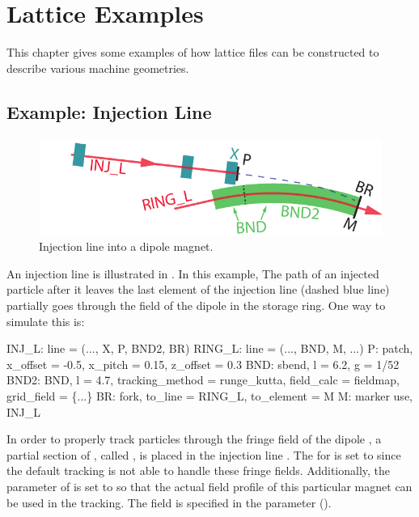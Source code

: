 \chapter{Lattice Examples}
\label{c:lat.example}

This chapter gives some examples of how lattice files can be constructed to describe various machine
geometries.

\section{Example: Injection Line}
\label{s:ex.inj}

\begin{figure}[tb]
  \centering
  \includegraphics[width=5in]{injection.pdf}
  \caption[Injection line into a dipole magnet.]{Injection line into a dipole magnet.
  }
  \label{f:inject}
\end{figure}

An injection line is illustrated in . In this example, The path of an injected
particle after it leaves the last element  of the injection line (dashed blue line) partially
goes through the field of the dipole  in the storage ring. One way to simulate this is:
\begin{example}
  INJ_L: line = (..., X, P, BND2, BR)
  RING_L: line = (..., BND, M, ...)
  P: patch, x_offset = -0.5, x_pitch = 0.15, z_offset = 0.3 
  BND: sbend, l = 6.2, g = 1/52
  BND2: BND, l = 4.7, tracking_method = runge_kutta,
          field_calc = fieldmap, grid_field = \{...\}
  BR: fork, to_line = RING_L, to_element = M
  M: marker
  use, INJ_L
\end{example}

In order to properly track particles through the fringe field of the dipole , a partial
section of , called , is placed in the injection line . The
 for  is set to  since the default 
tracking is not able to handle these fringe fields. Additionally, the  parameter of
 is set to  so that the actual field profile of this particular magnet can be
used in the tracking. The field is specified in the  parameter ().

